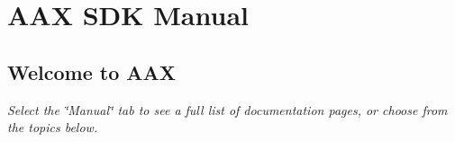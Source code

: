 \hypertarget{a00323}{}\section{A\+A\+X S\+D\+K Manual}
\label{a00323}


\subsection{ }
\hypertarget{a00323_welcome}{}\subsection{Welcome to A\+A\+X}\label{a00323_welcome}
{\itshape Select the \char`\"{}\+Manual\char`\"{} tab to see a full list of documentation pages, or choose from the topics below.}

